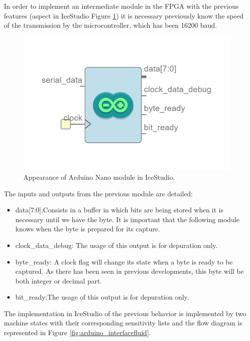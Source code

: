 In order to implement an intermediate module in the FPGA with the previous features (aspect in IceStudio Figure \ref{fig:arduino_interface}) it is necessary previously know the speed of the transmission by the microcontroller, which has been 16200 baud. \newline


\begin{figure}[H]
	\center	\includegraphics[scale=0.6]{imagenes/Balancing_robot/arduino_interface.PNG}
	\caption{Appearance of 	Arduino Nano module in IceStudio.}
	\label{fig:arduino_interface}
\end{figure}

The inputs and outputs from the previous module are detailed:

\begin{itemize}
	\item data[7:0]:Consists in a buffer in which bits are being stored when it is necessary until we have the byte. It is important that the following module knows when the byte is prepared for its capture.
	\item clock\_data\_debug: The usage of this output is for depuration only.
	\item byte\_ready: A clock flag will change its state when a byte is ready to be captured. As there has been seen in previous developments, this byte will be both integer or decimal part.
	\item bit\_ready:The usage of this output is for depuration only.
\end{itemize} 

The implementation in IceStudio of the previous behavior is implemented by two machine states with their corresponding sensitivity lists and the flow diagram is represented in Figure \ref{fig:arduino_interfacefluid}.

